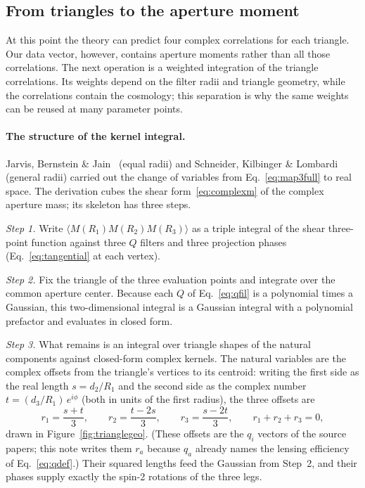 \documentclass[11pt]{article}
\numberwithin{equation}{section}
\begin{document}
\subsection{From triangles to the aperture moment}
\label{sec:sasintegral}

At this point the theory can predict four complex correlations for each
triangle. Our data vector, however, contains aperture moments rather than
all those correlations. The next operation is a weighted integration of
the triangle correlations. Its weights depend on the filter radii and
triangle geometry, while the correlations contain the cosmology; this
separation is why the same weights can be reused at many parameter points.

\paragraph{The structure of the kernel integral.}
Jarvis, Bernstein \& Jain~\cite{JBJ} (equal radii) and Schneider,
Kilbinger \& Lombardi~\cite{SKL} (general radii) carried out the
change of variables from Eq.~\eqref{eq:map3full} to real space.  The
derivation cubes the shear form~\eqref{eq:complexm} of the complex
aperture mass; its skeleton has three steps.

\emph{Step 1.}  Write
$\langle M(R_1) M(R_2) M(R_3)\rangle$ as a triple integral of the
shear three-point function against three $Q$ filters and three
projection phases (Eq.~\eqref{eq:tangential} at each vertex).

\emph{Step 2.}  Fix the triangle of the three evaluation points and
integrate over the common aperture center.  Because each $Q$ of
Eq.~\eqref{eq:qfil} is a polynomial times a Gaussian, this
two-dimensional integral is a Gaussian integral with a polynomial
prefactor and evaluates in closed form.

\emph{Step 3.}  What remains is an integral over triangle shapes of
the natural components against closed-form complex kernels.  The
natural variables are the complex offsets from the triangle's
vertices to its centroid: writing the first side as the real length
$s = d_2/R_1$ and the second side as the complex number
$t = (d_3/R_1)\, e^{i\phi}$ (both in units of the first radius), the
three offsets are
\begin{equation}
  r_1 = \frac{s + t}{3}, \qquad
  r_2 = \frac{t - 2s}{3}, \qquad
  r_3 = \frac{s - 2t}{3},
  \qquad r_1 + r_2 + r_3 = 0 ,
  \label{eq:offsets}
\end{equation}
drawn in Figure~\ref{fig:trianglegeo}.  (These offsets are the
$q_i$ vectors of the source papers; this note writes them $r_a$
because $q_a$ already names the lensing efficiency of
Eq.~\eqref{eq:qdef}.)  Their squared lengths feed the Gaussian from
Step~2, and their phases supply exactly the spin-2 rotations of the
three legs.
\end{document}
